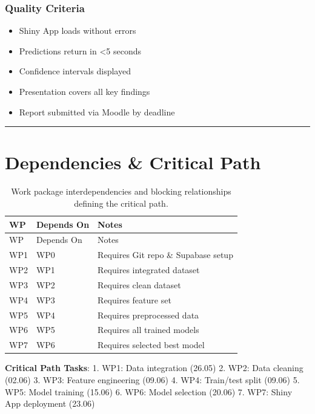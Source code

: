 \documentclass[
  english,
  letterpaper,
  DIV=11,
  numbers=noendperiod]{scrreprt}
\providecommand{\tightlist}{%
  \setlength{\itemsep}{0pt}\setlength{\parskip}{0pt}}
\begin{document}
\subsubsection{Quality Criteria}\label{quality-criteria-6}

\begin{itemize}
\tightlist
\item[$\square$]
  Shiny App loads without errors
\item[$\square$]
  Predictions return in \textless5 seconds
\item[$\square$]
  Confidence intervals displayed
\item[$\square$]
  Presentation covers all key findings
\item[$\square$]
  Report submitted via Moodle by deadline
\end{itemize}

\begin{center}\rule{0.5\linewidth}{0.5pt}\end{center}

\section{Dependencies \& Critical
Path}\label{dependencies-critical-path}

\begin{longtable}[]{@{}lll@{}}
\caption{Work package interdependencies and blocking relationships
defining the critical path.}\label{tbl-dependencies}\tabularnewline
\toprule\noalign{}
WP & Depends On & Notes \\
\midrule\noalign{}
\endfirsthead
\toprule\noalign{}
WP & Depends On & Notes \\
\midrule\noalign{}
\endhead
\bottomrule\noalign{}
\endlastfoot
WP1 & WP0 & Requires Git repo \& Supabase setup \\
WP2 & WP1 & Requires integrated dataset \\
WP3 & WP2 & Requires clean dataset \\
WP4 & WP3 & Requires feature set \\
WP5 & WP4 & Requires preprocessed data \\
WP6 & WP5 & Requires all trained models \\
WP7 & WP6 & Requires selected best model \\
\end{longtable}

\textbf{Critical Path Tasks}: 1. WP1: Data integration (26.05) 2. WP2:
Data cleaning (02.06) 3. WP3: Feature engineering (09.06) 4. WP4:
Train/test split (09.06) 5. WP5: Model training (15.06) 6. WP6: Model
selection (20.06) 7. WP7: Shiny App deployment (23.06)
\end{document}
